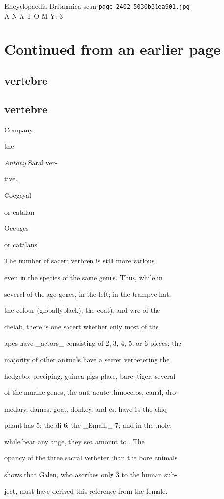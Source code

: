 \documentclass{article}
\begin{document}
\begin{center}
{\Large Encyclopaedia Britannica scan \texttt{page-2402-5030b31ea901.jpg}}\\[0.5em]
A N A T O M Y. 3
\end{center}
\section*{Continued from an earlier page}
\subsection*{vertebre}
\subsection*{vertebre}
Company

the

\textit{Antony}
Saral ver-

tive.

Cocgeyal

or catalan

Occuges

or catalans

The number of sacert verbren is still more various

even in the species of the same genus. Thus, while in

several of the age genes, in the left; in the trampve hat,

the colour (globallyblack); the coat), and wre of the

dielab, there is one sacert whether only most of the

apes have \_actors\_ consisting of 2, 3, 4, 5, or 6 pieces; the

majority of other animals have a secret verbetering the

hedgebo; preciping, guinea pigs place, bare, tiger, several

of the murine genes, the anti-acute rhinoceros, canal, dro-

medary, damos, goat, donkey, and es, have 1s the chiq

phant has 5; the di 6; the \_Email:\_ 7; and in the mole,

while bear any ange, they sea amount to . The

opancy of the three sacral verbeter than the bore animals

shows that Galen, who ascribes only 3 to the human sub-

ject, must have derived this reference from the female.
\end{document}

